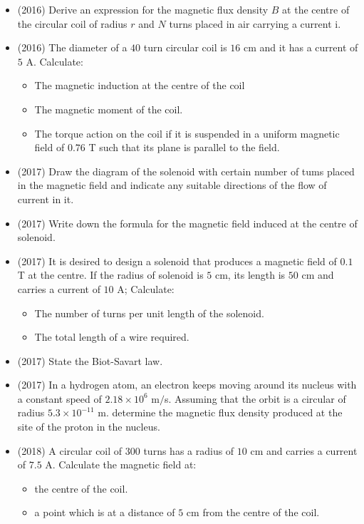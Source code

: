 \documentclass{article}
\begin{document}
\begin{itemize}
\begin{itemize}
\end{itemize}
\item (2016)  Derive an expression for the magnetic flux density $ B$ at the centre of the circular coil of radius $ r$ and $ N$ turns placed in air carrying a current i.
\item (2016)  The diameter of a $ 40$ turn circular coil is $ 16$ cm and it has a current of $ 5$ A.  Calculate:
 \begin{itemize}
\item The magnetic induction at the centre of the coil
\item The magnetic moment of the coil.
\item The torque action on the coil if it is suspended in a uniform magnetic field of $ 0.76$ T such that its plane is parallel to the field.
\end{itemize}
\item (2017)  Draw the diagram of the solenoid with certain number of tums placed in the magnetic field and indicate any suitable directions of the flow of current in it.
\item (2017)  Write down the formula for the magnetic field induced at the centre of solenoid. 
\item (2017)  It is desired to design a solenoid that produces a magnetic field of $ 0.1$ T at the centre. If the radius of solenoid is $ 5$ cm, its length is $ 50$ cm and carries a current of $ 10$ A; Calculate:
 \begin{itemize}
\item The number of turns per unit length of the solenoid. 
\item The total length of a wire required. 
\end{itemize}
\item (2017)  State the Biot-Savart law. 
\item (2017)  In a hydrogen atom, an electron keeps moving around its nucleus with a constant speed of $ 2.18 \times 10^{6}$ m$/$s. Assuming that the orbit is a circular of radius $ 5.3 \times 10^{-11}$ m. determine the magnetic flux density produced at the site of the proton in the nucleus. 
\item (2018)  A circular coil of $ 300$ turns has a radius of $ 10$ cm and carries a current of $ 7.5$ A. Calculate the magnetic field at:
 \begin{itemize}
\item the centre of the coil. 
\item a point which is at a distance of $ 5$ cm from the centre of the coil. 

\end{itemize}
\end{itemize}
\end{document}
